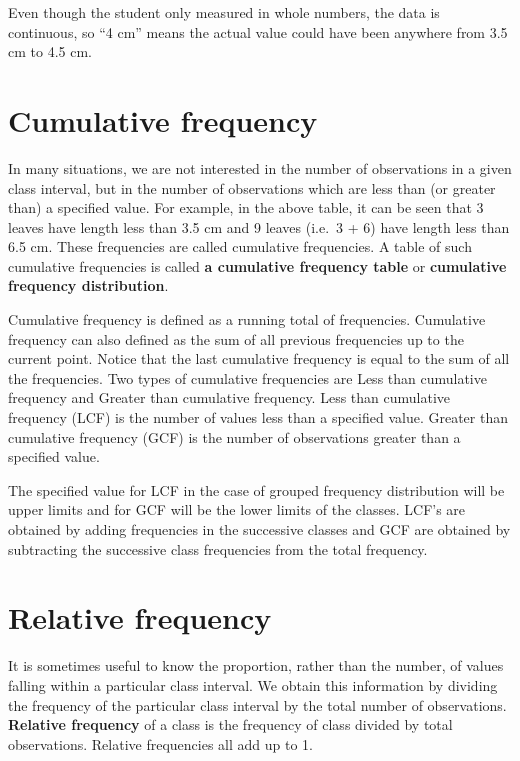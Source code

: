 \documentclass[
]{book}
\begin{document}
Even though the student only measured in whole numbers, the data is
continuous, so ``4 cm'' means the actual value could have been anywhere
from 3.5 cm to 4.5 cm.

\hypertarget{cumulative-frequency}{%
\section{Cumulative frequency}\label{cumulative-frequency}}

In many situations, we are not interested in the number of observations
in a given class interval, but in the number of observations which are
less than (or greater than) a specified value. For example, in the above
table, it can be seen that 3 leaves have length less than 3.5 cm and 9
leaves (i.e.~3 + 6) have length less than 6.5 cm. These frequencies are
called cumulative frequencies. A table of such cumulative frequencies is
called \textbf{a cumulative frequency table} or \textbf{cumulative frequency
distribution}.

Cumulative frequency is defined as a running total of frequencies.
Cumulative frequency can also defined as the sum of all previous
frequencies up to the current point. Notice that the last cumulative
frequency is equal to the sum of all the frequencies. Two types of
cumulative frequencies are Less than cumulative frequency and Greater
than cumulative frequency. Less than cumulative frequency (LCF) is the
number of values less than a specified value. Greater than cumulative
frequency (GCF) is the number of observations greater than a specified
value.

The specified value for LCF in the case of grouped frequency
distribution will be upper limits and for GCF will be the lower limits
of the classes. LCF's are obtained by adding frequencies in the
successive classes and GCF are obtained by subtracting the successive
class frequencies from the total frequency.

\hypertarget{relative-frequency}{%
\section{Relative frequency}\label{relative-frequency}}

It is sometimes useful to know the proportion, rather than the number,
of values falling within a particular class interval. We obtain this
information by dividing the frequency of the particular class interval
by the total number of observations. \textbf{Relative frequency} of a class
is the frequency of class divided by total observations. Relative
frequencies all add up to 1.
\end{document}
